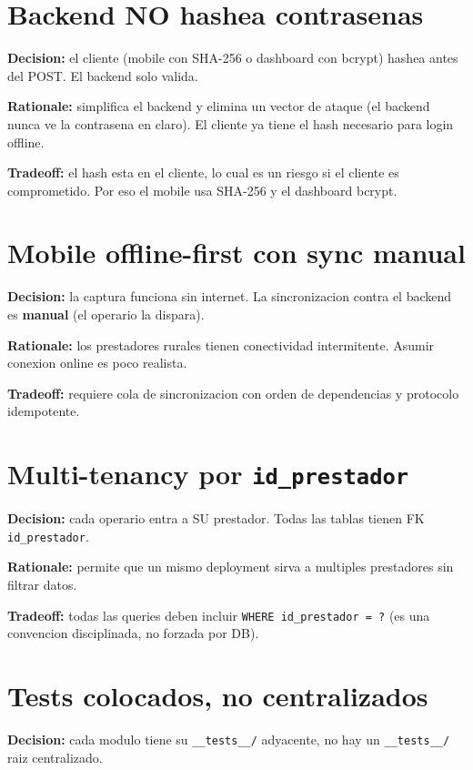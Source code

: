 \documentclass[11pt,a4paper,oneside]{report}
\begin{document}
\section{Backend NO hashea contrasenas}

\textbf{Decision:} el cliente (mobile con SHA-256 o dashboard con bcrypt) hashea antes del POST. El backend solo valida.

\textbf{Rationale:} simplifica el backend y elimina un vector de ataque (el backend nunca ve la contrasena en claro). El cliente ya tiene el hash necesario para login offline.

\textbf{Tradeoff:} el hash esta en el cliente, lo cual es un riesgo si el cliente es comprometido. Por eso el mobile usa SHA-256 y el dashboard bcrypt.

\section{Mobile offline-first con sync manual}

\textbf{Decision:} la captura funciona sin internet. La sincronizacion contra el backend es \textbf{manual} (el operario la dispara).

\textbf{Rationale:} los prestadores rurales tienen conectividad intermitente. Asumir conexion online es poco realista.

\textbf{Tradeoff:} requiere cola de sincronizacion con orden de dependencias y protocolo idempotente.

\section{Multi-tenancy por \texttt{id\_prestador}}

\textbf{Decision:} cada operario entra a SU prestador. Todas las tablas tienen FK \texttt{id\_prestador}.

\textbf{Rationale:} permite que un mismo deployment sirva a multiples prestadores sin filtrar datos.

\textbf{Tradeoff:} todas las queries deben incluir \texttt{WHERE id\_prestador = ?} (es una convencion disciplinada, no forzada por DB).

\section{Tests colocados, no centralizados}

\textbf{Decision:} cada modulo tiene su \texttt{\_\_tests\_\_/} adyacente, no hay un \texttt{\_\_tests\_\_/} raiz centralizado.
\end{document}
